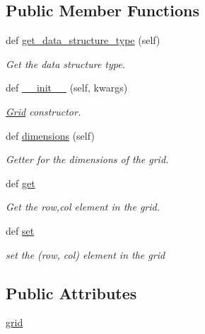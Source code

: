 \subsection*{Public Member Functions}
\begin{DoxyCompactItemize}
\item 
def \hyperlink{classbridges_1_1grid_1_1_grid_ab1a040a486bbad5259fec54fb885eac1}{get\+\_\+data\+\_\+structure\+\_\+type} (self)
\begin{DoxyCompactList}\small\item\em Get the data structure type. \end{DoxyCompactList}\item 
def \hyperlink{classbridges_1_1grid_1_1_grid_a25587e3c0f450b336fc7bb11fc718c36}{\+\_\+\+\_\+init\+\_\+\+\_\+} (self, kwargs)
\begin{DoxyCompactList}\small\item\em \hyperlink{classbridges_1_1grid_1_1_grid}{Grid} constructor. \end{DoxyCompactList}\item 
def \hyperlink{classbridges_1_1grid_1_1_grid_a48f2107f2a2e970ada851012019a01dc}{dimensions} (self)
\begin{DoxyCompactList}\small\item\em Getter for the dimensions of the grid. \end{DoxyCompactList}\item 
def \hyperlink{classbridges_1_1grid_1_1_grid_a354c049fedceef226ff62aedf78c2a72}{get}
\begin{DoxyCompactList}\small\item\em Get the row,col element in the grid. \end{DoxyCompactList}\item 
def \hyperlink{classbridges_1_1grid_1_1_grid_a40d076434ad49fe29f6a931aba9f442b}{set}
\begin{DoxyCompactList}\small\item\em set the (row, col) element in the grid \end{DoxyCompactList}\end{DoxyCompactItemize}
\subsection*{Public Attributes}
\begin{DoxyCompactItemize}
\item 
\hyperlink{classbridges_1_1grid_1_1_grid_a609e662d769bbda34e88dd2be0307f4f}{grid}
\end{DoxyCompactItemize}
